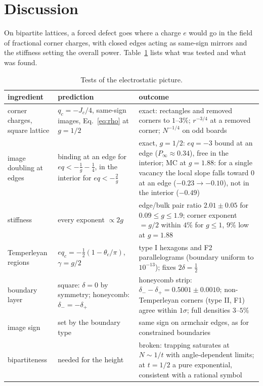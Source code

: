 \documentclass[aps,pre,twocolumn,superscriptaddress,nofootinbib,floatfix]{revtex4-2}
\begin{document}
\section{Discussion}
\label{sec:summary}
On bipartite lattices, a forced defect goes where a charge $e$ would go in the field of fractional corner charges, with closed edges acting as same-sign mirrors and the stiffness setting the overall power. Table~\ref{tab:verdict} lists what was tested and what was found.

\begin{table}[t]
\caption{Tests of the electrostatic picture.}
\label{tab:verdict}
\begin{ruledtabular}
\begin{tabular}{p{3.6cm}p{5.0cm}p{8.2cm}}
ingredient & prediction & outcome\\ \hline
corner charges, square lattice & $q_c=-J_c/4$, same-sign images, Eq.~\eqref{eq:rho} at $g=1/2$ & exact: rectangles and removed corners to $1$--$3\%$; $r^{-3/4}$ at a removed corner; $N^{-1/4}$ on odd boards\\
image doubling at edges & binding at an edge for $eq<-\tfrac1g-\tfrac14$, in the interior for $eq<-\tfrac2g$ & exact, $g=1/2$: $eq=-3$ bound at an edge ($P_\infty\approx0.34$), free in the interior; MC at $g=1.88$: for a single vacancy the local slope falls toward $0$ at an edge ($-0.23\to-0.10$), not in the interior ($-0.49$)\\
stiffness & every exponent $\propto2g$ & edge/bulk pair ratio $2.01\pm0.05$ for $0.09\le g\le1.9$; corner exponent $=g/2$ within $4\%$ for $g\le1$, $9\%$ low at $g=1.88$\\
Temperleyan regions & $eq_c=-\tfrac12(1-\theta_c/\pi)$, $\gamma=g/2$ & type I hexagons and F2 parallelograms (boundary uniform to $10^{-13}$); fixes $2\delta=\tfrac12$\\
boundary layer & square: $\delta=0$ by symmetry; honeycomb: $\delta_-=-\delta_+$ & honeycomb strip: $\delta_--\delta_+=0.5001\pm0.0010$; non-Temperleyan corners (type II, F1) agree within $1\sigma$; full densities $3$--$5\%$\\
image sign & set by the boundary type & same sign on armchair edges, as for constrained boundaries~\cite{Ciucu2015}\\
bipartiteness & needed for the height & broken: trapping saturates at $N\sim1/t$ with angle-dependent limits; at $t=1/2$ a pure exponential, consistent with a rational symbol\\
\end{tabular}
\end{ruledtabular}
\end{table}
\end{document}
